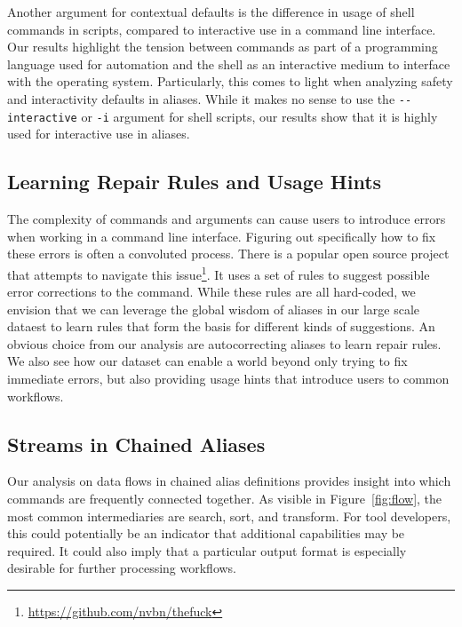 Another argument for contextual defaults is the difference in usage of shell commands in scripts, compared to interactive use in a command line interface.
Our results highlight the tension between commands as part of a programming language used for automation and the shell as an interactive medium to interface with the operating system.
Particularly, this comes to light when analyzing safety and interactivity defaults in aliases.
While it makes no sense to use the \verb|--interactive| or \verb|-i| argument for shell scripts, our results show that it is highly used for interactive use in aliases.

\subsection{Learning Repair Rules and Usage Hints}

The complexity of commands and arguments can cause users to introduce errors when working in a command line interface.
Figuring out specifically how to fix these errors is often a convoluted process.
There is a popular open source project that attempts to navigate this issue\footnote{\url{https://github.com/nvbn/thefuck}}.
It uses a set of rules to suggest possible error corrections to the command.
While these rules are all hard-coded, we envision that we can leverage the global wisdom of aliases in our large scale dataest to learn rules that form the basis for different kinds of suggestions.
An obvious choice from our analysis are autocorrecting aliases to learn repair rules.
We also see how our dataset can enable a world beyond only trying to fix immediate errors, but also providing usage hints that introduce users to common workflows.

\subsection{Streams in Chained Aliases}

Our analysis on data flows in chained alias definitions provides insight into which commands are frequently connected together.
As visible in Figure~\ref{fig:flow}, the most common intermediaries are search, sort, and transform.
For tool developers, this could potentially be an indicator that additional capabilities may be required.
It could also imply that a particular output format is especially desirable for further processing workflows.



